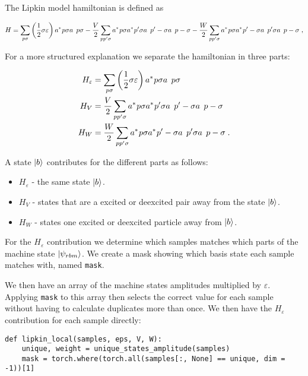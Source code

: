 The Lipkin model hamiltonian is defined as

\begin{equation} 
    H = \sum_{p\sigma} \left ( \frac{1}{2} \sigma \varepsilon \right ) \hc{a}{p\sigma}\op{a}{p\sigma} - \frac{V}{2}\sum_{pp'\sigma} \hc{a}{p\sigma} \hc{a}{p'\sigma} \op{a}{p'-\sigma}\op{a}{p-\sigma} - \frac{W}{2} \sum_{pp'\sigma} \hc{a}{p\sigma} \hc{a}{p'-\sigma} \op{a}{p'\sigma}\op{a}{p-\sigma} \; , 
\end{equation}

For a more structured explanation we separate the hamiltonian in three parts:

\begin{align}
  H_{\varepsilon} &= \sum_{p\sigma} \left ( \frac{1}{2} \sigma \varepsilon \right ) \hc{a}{p\sigma}\op{a}{p\sigma}\\ 
  H_V &= \frac{V}{2}\sum_{pp'\sigma} \hc{a}{p\sigma} \hc{a}{p'\sigma} \op{a}{p'-\sigma}\op{a}{p-\sigma}\\
  H_W &= \frac{W}{2} \sum_{pp'\sigma} \hc{a}{p\sigma} \hc{a}{p'-\sigma} \op{a}{p'\sigma}\op{a}{p-\sigma}  \; .
  \label{eq:LMG_split_H}
\end{align}

 A state $\ket{b}$ contributes for the different parts as follows:

\begin{itemize}
  \item $H_{\varepsilon}$ - the same state $\ket{b}$.
  \item $H_V$ - states that are a excited or deexcited pair away from the state $\ket{b}$.
  \item $H_W$ - states one excited or deexcited particle away from $\ket{b}$.
\end{itemize}

For the $H_{\varepsilon}$ contribution we determine which samples matches which parts of the machine state $\ket{\psi_{rbm}}$. We create a mask showing which basis state each sample matches with, named \texttt{mask}.

We then have an array of the machine states amplitudes multiplied by $\varepsilon$. Applying \texttt{mask} to this array then selects the correct value for each sample without having to calculate duplicates more than once. We then have the $H_{\varepsilon}$ contribution for each sample directly:

\begin{verbatim}
def lipkin_local(samples, eps, V, W):
    unique, weight = unique_states_amplitude(samples)
    mask = torch.where(torch.all(samples[:, None] == unique, dim = -1))[1]
\end{verbatim}

